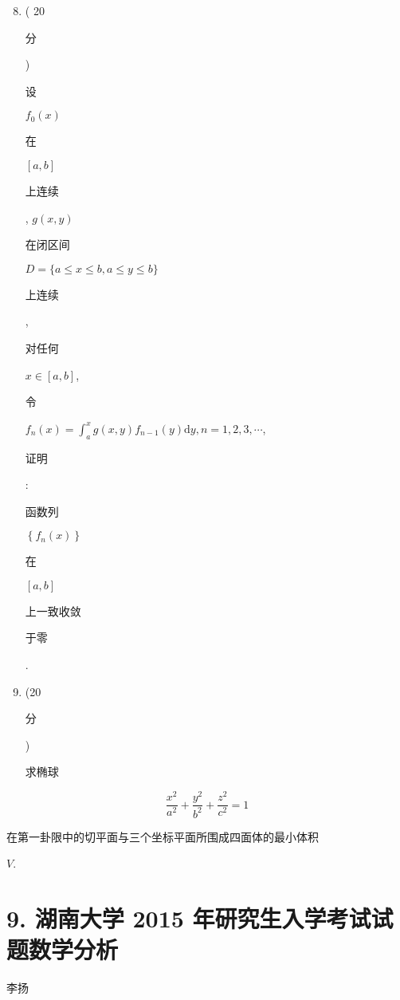 \documentclass[10pt]{article}
\begin{document}
\begin{enumerate}
  \setcounter{enumi}{7}
  \item ( 20 \begin{CJK}{UTF8}{mj}分\end{CJK}) \begin{CJK}{UTF8}{mj}设\end{CJK} $f_{0}(x)$ \begin{CJK}{UTF8}{mj}在\end{CJK} $[a, b]$ \begin{CJK}{UTF8}{mj}上连续\end{CJK}, $g(x, y)$ \begin{CJK}{UTF8}{mj}在闭区间\end{CJK} $D=\{a \leqslant x \leqslant b, a \leqslant y \leqslant b\}$ \begin{CJK}{UTF8}{mj}上连续\end{CJK}, \begin{CJK}{UTF8}{mj}对任何\end{CJK} $x \in[a, b]$, \begin{CJK}{UTF8}{mj}令\end{CJK} $f_{n}(x)=\int_{a}^{x} g(x, y) f_{n-1}(y) \mathrm{d} y, n=1,2,3, \cdots$, \begin{CJK}{UTF8}{mj}证明\end{CJK}: \begin{CJK}{UTF8}{mj}函数列\end{CJK} $\left\{f_{n}(x)\right\}$ \begin{CJK}{UTF8}{mj}在\end{CJK} $[a, b]$ \begin{CJK}{UTF8}{mj}上一致收敛\end{CJK} \begin{CJK}{UTF8}{mj}于零\end{CJK}.

  \item (20 \begin{CJK}{UTF8}{mj}分\end{CJK}) \begin{CJK}{UTF8}{mj}求椭球\end{CJK}

\end{enumerate}
$$
\frac{x^{2}}{a^{2}}+\frac{y^{2}}{b^{2}}+\frac{z^{2}}{c^{2}}=1
$$
\begin{CJK}{UTF8}{mj}在第一卦限中的切平面与三个坐标平面所围成四面体的最小体积\end{CJK} $V$.

\section{9. 湖南大学 2015 年研究生入学考试试题数学分析}
\begin{CJK}{UTF8}{mj}李扬\end{CJK}
\end{document}
